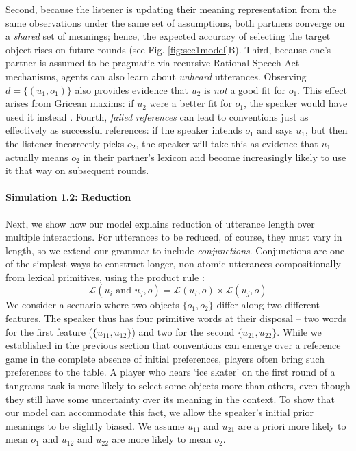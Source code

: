 Second, because the listener is updating their meaning representation from the same observations under the same set of assumptions, both partners converge on a \emph{shared} set of meanings; hence, the expected accuracy of selecting the target object rises on future rounds (see Fig. \ref{fig:sec1model}B). 
Third, because one's partner is assumed to be pragmatic via recursive Rational Speech Act mechanisms, agents can also learn about \emph{unheard} utterances. 
Observing $d = \{(u_1, o_1)\}$ also provides evidence that $u_2$ is \emph{not} a good fit for $o_1$.
This effect arises from Gricean maxims: if $u_2$ were a better fit for $o_1$, the speaker would have used it instead \cite{Grice75_LogicConversation}. 
Fourth, \emph{failed references} can lead to conventions just as effectively as successful references: if the speaker intends $o_1$ and says $u_1$, but then the listener incorrectly picks $o_2$, the speaker will take this as evidence that $u_1$ actually means $o_2$ in their partner's lexicon and become increasingly likely to use it that way on subsequent rounds.

\paragraph{Simulation 1.2: Reduction}

Next, we show how our model explains reduction of utterance length over multiple interactions. 
For utterances to be reduced, of course, they must vary in length, so we extend our grammar to include \emph{conjunctions}. 
Conjunctions are one of the simplest ways to construct longer, non-atomic utterances compositionally from lexical primitives, using the product rule \cite<see also>[who instead consider negation]{SteinertThrelkeld16_CompositionalSignaling}:
$$\mathcal{L}(u_i \textrm{ and } u_j, o) = \mathcal{L}(u_i, o) \times \mathcal{L}(u_j, o)$$
We consider a scenario where two objects $\{o_1, o_2\}$ differ along two different features. 
The speaker thus has four primitive words at their disposal -- two words for the first feature ($\{u_{11}, u_{12}\}$) and two for the second $\{u_{21}, u_{22}\}$. 
While we established in the previous section that conventions can emerge over a reference game in the complete absence of initial preferences, players often bring such preferences to the table. 
A player who hears `ice skater' on the first round of a tangrams task is more likely to select some objects more than others, even though they still have some uncertainty over its meaning in the context. 
To show that our model can accommodate this fact, we allow the speaker's initial prior meanings to be slightly biased. 
We assume $u_{11}$ and $u_{21}$ are a priori more likely to mean $o_1$ and $u_{12}$ and $u_{22}$ are more likely to mean $o_2$.

